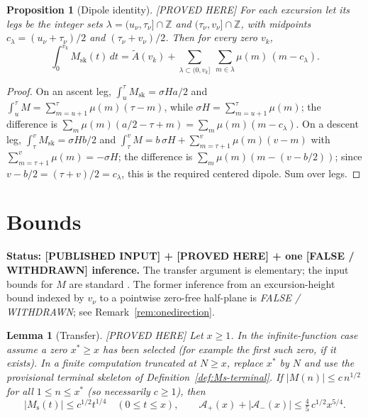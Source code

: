 \documentclass[11pt]{amsart}
\numberwithin{equation}{section}
\theoremstyle{plain}
\newtheorem{proposition}[theorem]{Proposition}
\newtheorem{lemma}[theorem]{Lemma}
\theoremstyle{definition}
\theoremstyle{remark}
\newcommand{\Ms}{M_{\mathrm{s}}}
\newcommand{\Msk}{M_{\mathrm{sk}}}
\newcommand{\Ap}{\mathcal{A}_{+}}
\newcommand{\Am}{\mathcal{A}_{-}}
\begin{document}
\begin{proposition}[Dipole identity]
\label{prop:dipoles}
\emph{[PROVED HERE]} For each excursion let its \emph{legs} be the integer
sets $\lambda=(u_\nu,\tau_\nu]\cap\mathbb{Z}$ and $(\tau_\nu,v_\nu]\cap\mathbb{Z}$,
with midpoints $c_\lambda=(u_\nu+\tau_\nu)/2$ and $(\tau_\nu+v_\nu)/2$. Then
for every zero $v_k$,
\begin{equation}
\label{eq:dipoles}
  \int_0^{v_k}\Msk(t)\,dt=\widetilde{A}(v_k)
  +\sum_{\lambda\subset(0,v_k]}\ \sum_{m\in\lambda}\mu(m)\,(m-c_\lambda).
\end{equation}
\end{proposition}

\begin{proof}
On an ascent leg, $\int_{u}^{\tau}\Msk=\sigma H a/2$ and
$\int_u^\tau M=\sum_{m=u+1}^{\tau}\mu(m)(\tau-m)$, while
$\sigma H=\sum_{m=u+1}^{\tau}\mu(m)$; the difference is
$\sum_m\mu(m)(a/2-\tau+m)=\sum_m\mu(m)(m-c_\lambda)$. On a descent leg,
$\int_\tau^v\Msk=\sigma Hb/2$ and
$\int_\tau^vM=b\,\sigma H+\sum_{m=\tau+1}^{v}\mu(m)(v-m)$ with
$\sum_{m=\tau+1}^{v}\mu(m)=-\sigma H$; the difference is
$\sum_m\mu(m)(m-(v-b/2))$; since
$v-b/2=(\tau+v)/2=c_\lambda$, this is the required centered dipole.  Sum
over legs.
\end{proof}

\section{Bounds}
\label{sec:bounds}

\noindent\textbf{Status: [PUBLISHED INPUT] + [PROVED HERE] + one [FALSE / WITHDRAWN] inference.} The
transfer argument is elementary; the input bounds for $M$ are standard
\cite{Walfisz1963,OdlyzkoTeRiele1985,KotnikTeRiele2006,Hurst18}. The
former inference from an excursion-height bound indexed by $v_\nu$ to a
pointwise zero-free half-plane is \emph{FALSE / WITHDRAWN}; see
Remark~\ref{rem:onedirection}.

\begin{lemma}[Transfer]
\label{lem:transfer}
\emph{[PROVED HERE]} Let $x\ge1$.  In the infinite-function case assume a
zero $x^*\ge x$ has been selected (for example the first such zero, if it
exists).  In a finite computation truncated at $N\ge x$, replace $x^*$ by
$N$ and use the provisional terminal skeleton of
Definition~\ref{def:Ms-terminal}.  If
$|M(n)|\le c\,n^{1/2}$ for all $1\le n\le x^*$ (so necessarily $c\ge1$),
then
\begin{equation}
\label{eq:transfer_bound}
  |\Ms(t)|\le c^{1/2}t^{1/4}\quad(0\le t\le x),\qquad
  \Ap(x)+|\Am(x)|\le\tfrac45\,c^{1/2}x^{5/4}.
\end{equation}
\end{lemma}
\end{document}
